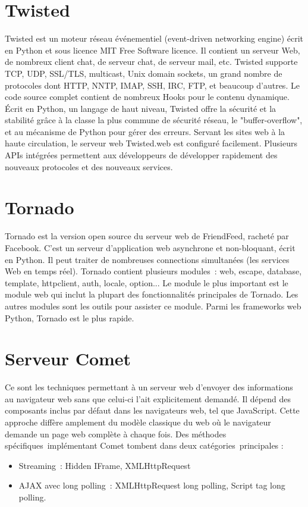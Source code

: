 \documentclass[a4paper,10pt]{report}
\begin{document}
  \section{Twisted}
  
Twisted est un moteur réseau événementiel (event-driven networking engine) écrit en Python et sous licence MIT Free Software licence. Il contient un serveur Web, de nombreux client chat, de serveur chat, de serveur mail, etc. Twisted supporte TCP, UDP, SSL/TLS, multicast, Unix domain sockets, un grand nombre de protocoles dont HTTP, NNTP, IMAP, SSH, IRC, FTP, et beaucoup d'autres.
Le code source complet contient de nombreux Hooks pour le contenu dynamique.
Écrit en Python, un langage de haut niveau, Twisted offre la sécurité et la stabilité grâce à la classe la plus commune de sécurité réseau, le "buffer-overflow", et au mécanisme de Python pour gérer des erreurs. 
Servant les sites web à la haute circulation, le serveur web Twisted.web est configuré facilement.
Plusieurs APIs intégrées permettent aux développeurs de développer rapidement des nouveaux protocoles et des nouveaux services.

  \section{Tornado}
  
Tornado est la version open source du serveur web de FriendFeed, racheté par Facebook. C’est un serveur d’application web asynchrone et non-bloquant,  écrit en Python. Il peut traiter de nombreuses connections simultanées (les services Web en temps réel).
Tornado contient plusieurs modules : web, escape, database, template, httpclient, auth, locale, option... Le module le plus important est le module web qui inclut la plupart des fonctionnalités principales de Tornado. Les autres modules sont les outils pour assister ce module.
Parmi les frameworks web Python, Tornado est le plus rapide.

  \section{Serveur Comet}
  
Ce sont les techniques permettant à un serveur web d'envoyer des informations au navigateur web sans que celui-ci l'ait explicitement demandé.  Il dépend des composants inclus par défaut dans les navigateurs web, tel que JavaScript. 
Cette approche diffère amplement du modèle classique du web où le navigateur demande un page web complète à chaque fois.
Des méthodes spécifiques implémentant Comet tombent dans deux catégories principales :
\begin{itemize}
 \item Streaming : Hidden IFrame, XMLHttpRequest
 \item AJAX avec long polling : XMLHttpRequest long polling, Script tag long polling.
\end{itemize}
\end{document}
